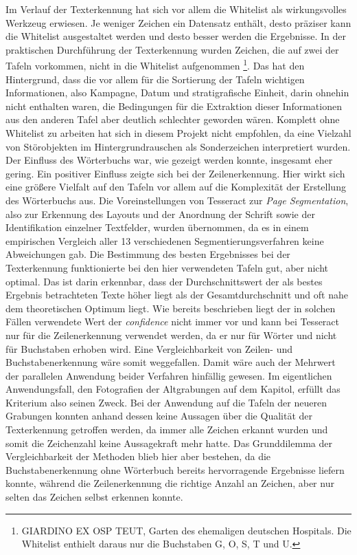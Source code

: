 Im Verlauf der Texterkennung hat sich vor allem die Whitelist als wirkungsvolles Werkzeug erwiesen. Je weniger Zeichen ein Datensatz enthält, desto präziser kann die Whitelist ausgestaltet werden und desto besser werden die Ergebnisse\cite[p.~107]{feldmann}. In der praktischen Durchführung der Texterkennung wurden Zeichen, die auf zwei der Tafeln vorkommen, nicht in die Whitelist aufgenommen \footnote{\glqq GIARDINO EX OSP TEUT\grqq, Garten des ehemaligen deutschen Hospitals. Die Whitelist enthielt daraus nur die Buchstaben G, O, S, T und U.}. Das hat den Hintergrund, dass die vor allem für die Sortierung der Tafeln wichtigen Informationen, also Kampagne, Datum und stratigrafische Einheit, darin ohnehin nicht enthalten waren, die Bedingungen für die Extraktion dieser Informationen aus den anderen Tafel aber deutlich schlechter geworden wären.
Komplett ohne Whitelist zu arbeiten hat sich in diesem Projekt nicht empfohlen, da eine Vielzahl von Störobjekten im Hintergrundrauschen als Sonderzeichen interpretiert wurden.
Der Einfluss des Wörterbuchs war, wie gezeigt werden konnte, insgesamt eher gering. Ein positiver Einfluss zeigte sich bei der Zeilenerkennung. Hier wirkt sich eine größere Vielfalt auf den Tafeln vor allem auf die Komplexität der Erstellung des Wörterbuchs aus.
Die Voreinstellungen von Tesseract zur \textit{Page Segmentation}, also zur Erkennung des Layouts und der Anordnung der Schrift sowie der Identifikation einzelner Textfelder, wurden übernommen, da es in einem empirischen Vergleich aller 13 verschiedenen Segmentierungsverfahren keine Abweichungen gab.
Die Bestimmung des besten Ergebnisses bei der Texterkennung funktionierte bei den hier verwendeten Tafeln gut, aber nicht optimal. Das ist darin erkennbar, dass der Durchschnittswert der als bestes Ergebnis betrachteten Texte höher liegt als der Gesamtdurchschnitt und oft nahe dem theoretischen Optimum liegt. Wie bereits beschrieben liegt der in solchen Fällen verwendete Wert der \textit{confidence} nicht immer vor und kann bei Tesseract nur für die Zeilenerkennung verwendet werden, da er nur für Wörter und nicht für Buchstaben erhoben wird. Eine Vergleichbarkeit von Zeilen- und Buchstabenerkennung wäre somit weggefallen. Damit wäre auch der Mehrwert der parallelen Anwendung beider Verfahren hinfällig gewesen. Im eigentlichen Anwendungsfall, den Fotografien der Altgrabungen auf dem Kapitol, erfüllt das Kriterium also seinen Zweck. Bei der Anwendung auf die Tafeln der neueren Grabungen konnten anhand dessen keine Aussagen über die Qualität der Texterkennung getroffen werden, da immer alle Zeichen erkannt wurden und somit die Zeichenzahl keine Aussagekraft mehr hatte. Das Grunddilemma der Vergleichbarkeit der Methoden blieb hier aber bestehen, da die Buchstabenerkennung ohne Wörterbuch bereits hervorragende Ergebnisse liefern konnte, während die Zeilenerkennung die richtige Anzahl an Zeichen, aber nur selten das Zeichen selbst erkennen konnte.
